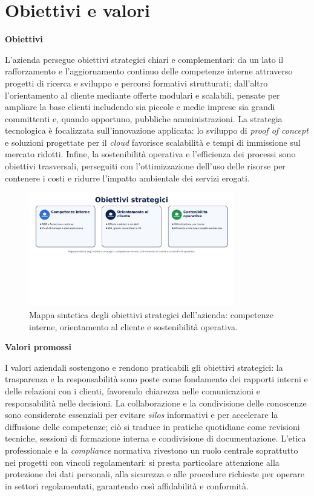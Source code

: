 \section{Obiettivi e valori}

\medskip
\noindent\textbf{Obiettivi}

L'azienda persegue obiettivi strategici chiari e complementari: da un lato il rafforzamento e l'aggiornamento continuo delle competenze interne attraverso progetti di ricerca e sviluppo e percorsi formativi
strutturati; dall'altro l'orientamento al cliente mediante offerte modulari e scalabili, pensate per ampliare la base clienti includendo sia piccole e medie imprese sia grandi committenti e,
quando opportuno, pubbliche amministrazioni. 
La strategia tecnologica è focalizzata sull'innovazione applicata: lo sviluppo di \emph{proof of concept} e soluzioni progettate per il \emph{cloud} favorisce
scalabilità e tempi di immissione sul mercato ridotti. 
Infine, la sostenibilità operativa e l'efficienza dei processi sono obiettivi trasversali, perseguiti con l'ottimizzazione dell'uso
delle risorse per contenere i costi e ridurre l'impatto ambientale dei servizi erogati.

\begin{figure}[htbp]
    \centering
    \includegraphics[width=0.8\textwidth]{images/azienda/obiettivi_strategici}
    \caption{Mappa sintetica degli obiettivi strategici dell’azienda: competenze interne, orientamento al cliente e sostenibilità operativa.}
    \label{fig:obiettivi}
  \end{figure}

\medskip
\noindent\textbf{Valori promossi}

I valori aziendali sostengono e rendono praticabili gli obiettivi strategici: la trasparenza e la responsabilità sono poste come fondamento dei
rapporti interni e delle relazioni con i clienti, favorendo chiarezza nelle comunicazioni e responsabilità nelle decisioni. La collaborazione e
la condivisione delle conoscenze sono considerate essenziali per evitare \emph{silos} informativi e per accelerare la diffusione delle competenze;
ciò si traduce in pratiche quotidiane come revisioni tecniche, sessioni di formazione interna e condivisione di documentazione.
L'etica professionale e la \emph{compliance} normativa rivestono un ruolo centrale soprattutto nei progetti con vincoli regolamentari:
si presta particolare attenzione alla protezione dei dati personali, alla sicurezza e alle procedure richieste per operare in settori regolamentati, garantendo così affidabilità e conformità.



